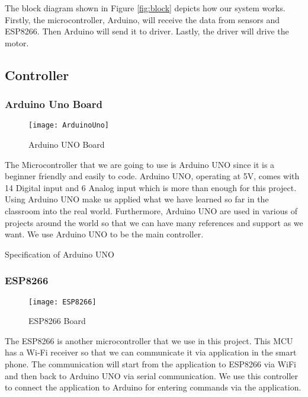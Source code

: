 \documentclass[12pt]{article}
\begin{document}
The block diagram shown in Figure \ref{fig:block} depicts how our system works. Firstly, the microcontroller, Arduino, will receive the data from sensors and ESP8266. Then Arduino will send it to driver. Lastly, the driver will drive the motor.

\subsection{Controller} \label{sub:controller}

\subsubsection{Arduino Uno Board} \label{subsub:arduino}

\begin{figure}[H]
	\centering
	\texttt{[image: ArduinoUno]}
	\caption{Arduino UNO Board} \label{fig:arduino}
\end{figure}

The Microcontroller that we are going to use is Arduino UNO since it is a beginner friendly and easily to code. Arduino UNO, operating at 5V, comes with 14 Digital input and 6 Analog input which is more than enough for this project. Using Arduino UNO make us applied what we have learned so far in the classroom into the real world. Furthermore, Arduino UNO are used in various of projects around the world so that we can have many references and support as we want. We use Arduino UNO to be the main controller.

\begin{table}[H]
	\centering
	\label{tab:arduino}
	\caption{Specification of Arduino UNO}
\end{table}

\subsubsection{ESP8266} \label{subsub:esp}

\begin{figure}[H]
	\centering
	\texttt{[image: ESP8266]}
	\caption{ESP8266 Board} \label{fig:esp}
\end{figure}

\normalfont The ESP8266 is another microcontroller that we use in this project. This MCU has a Wi-Fi receiver so that we can communicate it via application in the smart phone. The communication will start from the application to ESP8266 via WiFi and then back to Arduino UNO via serial communication. We use this controller to connect the application to Arduino for entering commands via the application.
\end{document}
